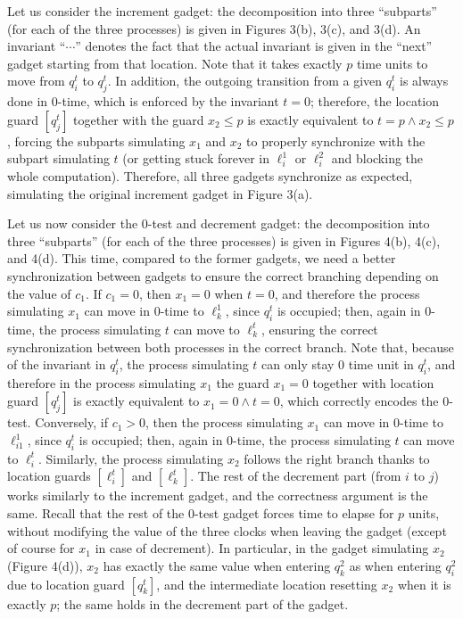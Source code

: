 Let us consider the increment gadget: the decomposition into three “subparts” (for each of the three processes) is given in Figures 3(b), 3(c), and 3(d). An invariant “$\cdots$” denotes the fact that the actual invariant is given in the “next” gadget starting from that location. Note that it takes exactly $p$ time units to move from $q_{i}^{t}$ to $q_{j}^{t}$. In addition, the outgoing transition from a given $q_{i}^{t}$ is always done in 0-time, which is enforced by the invariant $t=0$; therefore, the location guard $[q_{j}^{t}]$ together with the guard $x_{2}\leq p$ is exactly equivalent to $t=p\land x_{2}\leq p$, forcing the subparts simulating $x_{1}$ and $x_{2}$ to properly synchronize with the subpart simulating $t$ (or getting stuck forever in $\mathrm{\mathrm{\ell}}_{i}^{1}$ or $\mathrm{\mathrm{\ell}}_{i}^{2}$ and blocking the whole computation). Therefore, all three gadgets synchronize as expected, simulating the original increment gadget in Figure 3(a).\par
 
 
 
Let us now consider the 0-test and decrement gadget: the decomposition into three “subparts” (for each of the three processes) is given in Figures 4(b), 4(c), and 4(d). This time, compared to the former gadgets, we need a better synchronization between gadgets to ensure the correct branching depending on the value of $c_{1}$. If $c_{1}=0$, then $x_{1}=0$ when $t=0$, and therefore the process simulating $x_{1}$ can move in 0-time to $\mathrm{\mathrm{\ell}}_{k}^{1}$, since $q_{i}^{t}$ is occupied; then, again in 0-time, the process simulating $t$ can move to $\mathrm{\mathrm{\ell}}_{k}^{t}$, ensuring the correct synchronization between both processes in the correct branch. Note that, because of the invariant in $q_{i}^{t}$, the process simulating $t$ can only stay 0 time unit in $q_{i}^{t}$, and therefore in the process simulating $x_{1}$ the guard $x_{1}=0$ together with location guard $[q_{j}^{t}]$ is exactly equivalent to $x_{1}=0\land t=0$, which correctly encodes the 0-test. Conversely, if $c_{1}>0$, then the process simulating $x_{1}$ can move in 0-time to $\mathrm{\mathrm{\ell}}_{i1}^{1}$, since $q_{i}^{t}$ is occupied; then, again in 0-time, the process simulating $t$ can move to $\mathrm{\mathrm{\ell}}_{i}^{t}$. Similarly, the process simulating $x_{2}$ follows the right branch thanks to location guards $[\mathrm{\mathrm{\ell}}_{i}^{t}]$ and $[\mathrm{\mathrm{\ell}}_{k}^{t}]$. The rest of the decrement part (from $i$ to $j$) works similarly to the increment gadget, and the correctness argument is the same. Recall that the rest of the 0-test gadget forces time to elapse for $p$ units, without modifying the value of the three clocks when leaving the gadget (except of course for $x_{1}$ in case of decrement). In particular, in the gadget simulating $x_{2}$ (Figure 4(d)), $x_{2}$ has exactly the same value when entering $q_{k}^{2}$ as when entering $q_{i}^{2}$ due to location guard $[q_{k}^{t}]$, and the intermediate location resetting $x_{2}$ when it is exactly $p$; the same holds in the decrement part of the gadget.\par
 
